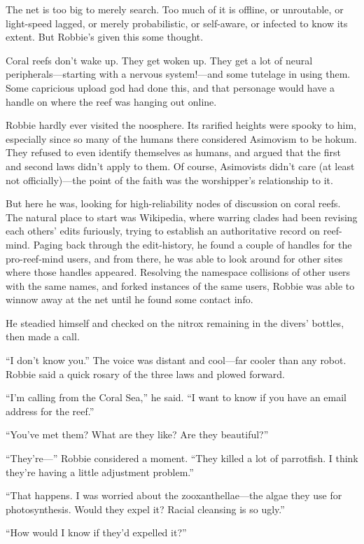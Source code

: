 The net is too big to merely search. Too much of it is offline, or
unroutable, or light-speed lagged, or merely probabilistic, or
self-aware, or infected to know its extent. But Robbie’s given this
some thought.

Coral reefs don’t wake up. They get woken up. They get a lot of
neural peripherals—starting with a nervous system!—and some
tutelage in using them. Some capricious upload god had done this,
and that personage would have a handle on where the reef was
hanging out online.

Robbie hardly ever visited the noosphere. Its rarified heights were
spooky to him, especially since so many of the humans there
considered Asimovism to be hokum. They refused to even identify
themselves as humans, and argued that the first and second laws
didn’t apply to them. Of course, Asimovists didn’t care (at least
not officially)—the point of the faith was the worshipper’s
relationship to it.

But here he was, looking for high-reliability nodes of discussion
on coral reefs. The natural place to start was Wikipedia, where
warring clades had been revising each others’ edits furiously,
trying to establish an authoritative record on reef-mind. Paging
back through the edit-history, he found a couple of handles for the
pro-reef-mind users, and from there, he was able to look around for
other sites where those handles appeared. Resolving the namespace
collisions of other users with the same names, and forked instances
of the same users, Robbie was able to winnow away at the net until
he found some contact info.

He steadied himself and checked on the nitrox remaining in the
divers’ bottles, then made a call.

“I don’t know you.” The voice was distant and cool—far cooler than
any robot. Robbie said a quick rosary of the three laws and plowed
forward.

“I’m calling from the Coral Sea,” he said. “I want to know if you
have an email address for the reef.”

“You’ve met them? What are they like? Are they beautiful?”

“They’re—” Robbie considered a moment. “They killed a lot of
parrotfish. I think they’re having a little adjustment problem.”

“That happens. I was worried about the zooxanthellae—the algae they
use for photosynthesis. Would they expel it? Racial cleansing is so
ugly.”

“How would I know if they’d expelled it?”

